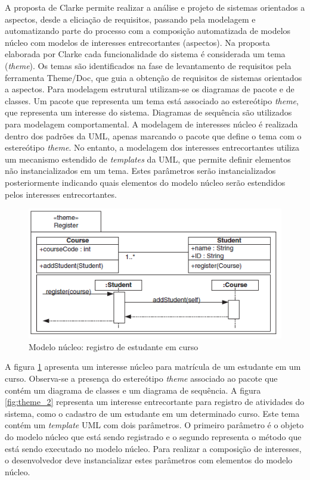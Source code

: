 A proposta de Clarke \cite{clarke:04} permite realizar a análise e projeto de sistemas orientados a aspectos, desde a eliciação de requisitos,
passando pela modelagem e automatizando parte do processo com a composição automatizada de modelos núcleo com modelos de interesses entrecortantes
(aspectos). Na proposta elaborada por Clarke cada funcionalidade do sistema é considerada um tema (\textit{theme}). Os temas são identificados na fase
de levantamento de requisitos pela ferramenta Theme/Doc, que guia a obtenção de requisitos de sistemas orientados a aspectos. Para modelagem
estrutural utilizam-se os diagramas de pacote e de classes. Um pacote que representa um tema está associado ao estereótipo \textit{theme}, 
que representa um interesse do sistema. Diagramas de sequência são utilizados para modelagem comportamental. A modelagem de interesses
núcleo é realizada dentro dos padrões da UML, apenas marcando o pacote que define o tema com o estereótipo \textit{theme}. No entanto, a modelagem dos
interesses entrecortantes utiliza um mecanismo estendido de \textit{templates} da UML, que permite definir elementos não instancializados em um tema. 
Estes parâmetros serão instancializados posteriormente indicando quais elementos do modelo núcleo serão estendidos pelos interesses
entrecortantes. 

\begin{figure}
	\centering
	\includegraphics{img/theme_1.png}
	\caption{Modelo núcleo: registro de estudante em curso}\label{fig:theme_1}
\end{figure}

A figura \ref{fig:theme_1} apresenta um interesse núcleo para matrícula de um estudante em um curso. Observa-se a presença do estereótipo
\textit{theme} associado ao pacote que contém um diagrama de classes e um diagrama de sequência. A figura \ref{fig:theme_2} representa um interesse
entrecortante para registro de atividades do sistema, como o cadastro de um estudante em um determinado curso. Este tema contém um \textit{template}
UML com dois parâmetros. O primeiro parâmetro é o objeto do modelo núcleo que está sendo registrado e o segundo representa o método que está sendo
executado no modelo núcleo. Para realizar a composição de interesses, o desenvolvedor deve instancializar estes parâmetros com elementos do modelo
núcleo.

